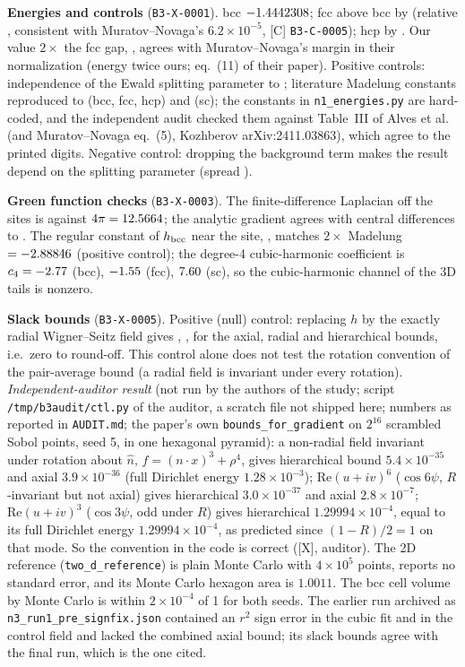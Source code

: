 \documentclass[10pt]{article}
\newcommand{\tier}[1]{\textsf{[#1]}}
\newcommand{\cid}[1]{\texttt{B3-#1}}
\theoremstyle{remark}
\begin{document}
\textbf{Energies and controls} (\cid{X-0001}). bcc $-1.4442308$; fcc above bcc by \BGapFcc{} (relative \BRelGapFcc, consistent with Muratov--Novaga's $6.2\times10^{-5}$, \tier{C} \cid{C-0005}); hcp by \BGapHcp.
Our value $2\times$ the fcc gap, \BTwoGap, agrees with Muratov--Novaga's margin \BMNMargin{} in their normalization (energy twice ours; eq.~(11) of their paper).
Positive controls: independence of the Ewald splitting parameter to \BAlphaSpread; literature Madelung constants reproduced to \BMadDev{} (bcc, fcc, hcp) and \BMadDevSc{} (sc); the constants in \texttt{n1\_energies.py} are hard-coded, and the independent audit checked them against Table~III of Alves et al.~\cite{alves} (and Muratov--Novaga eq.~(5), Kozhberov arXiv:2411.03863), which agree to the printed digits. Negative control: dropping the background term makes the result depend on the splitting parameter (spread \BNegSpread).

\textbf{Green function checks} (\cid{X-0003}). The finite-difference Laplacian off the sites is \BLapFD{} against $4\pi=12.5664$; the analytic gradient agrees with central differences to \BGradDev.
The regular constant of $h_{\rm bcc}$ near the site, \BCReg, matches $2\times$ Madelung $=-2.88846$ (positive control); the degree-4 cubic-harmonic coefficient is $c_4=-2.77$ (bcc), $-1.55$ (fcc), $7.60$ (sc), so the cubic-harmonic channel of the 3D tails is nonzero.

\textbf{Slack bounds} (\cid{X-0005}). Positive (null) control: replacing $h$ by the exactly radial Wigner--Seitz field gives \BWSAx, \BWSRad, \BWSHier{} for the axial, radial and hierarchical bounds, i.e.\ zero to round-off. This control alone does not test the rotation convention
of the pair-average bound (a radial field is invariant under every rotation). \emph{Independent-auditor result} (not run by the authors of the study; script \texttt{/tmp/b3audit/ctl.py} of the auditor, a scratch file not shipped here; numbers as reported in \texttt{AUDIT.md}; the paper's own \texttt{bounds\_for\_gradient} on $2^{16}$ scrambled Sobol points, seed 5, in one hexagonal pyramid): a non-radial field invariant under rotation about $\hat n$, $f=(n\!\cdot\!x)^3+\rho^4$, gives hierarchical bound $5.4\times10^{-35}$ and axial $3.9\times10^{-36}$ (full Dirichlet energy $1.28\times10^{-3}$); $\mathrm{Re}(u+iv)^6$ ($\cos6\psi$, $R$-invariant but not axial) gives hierarchical $3.0\times10^{-37}$ and axial $2.8\times10^{-7}$; $\mathrm{Re}(u+iv)^3$ ($\cos3\psi$, odd under $R$) gives hierarchical $1.29994\times10^{-4}$, equal to its full Dirichlet energy $1.29994\times10^{-4}$, as predicted since $(1-R)/2=1$ on that mode. So the convention in the code is correct (\tier{X}, auditor). The 2D reference (\texttt{two\_d\_reference}) is plain Monte Carlo with $4\times10^5$ points, reports no standard error, and its Monte Carlo hexagon area is $1.0011$. The bcc cell volume by Monte Carlo is within $2\times10^{-4}$ of 1 for both seeds. The earlier run archived as \texttt{n3\_run1\_pre\_signfix.json} contained an $r^2$ sign error in the cubic fit and in the control field and lacked the combined axial bound; its slack bounds agree with the final run, which is the one cited.
\end{document}
